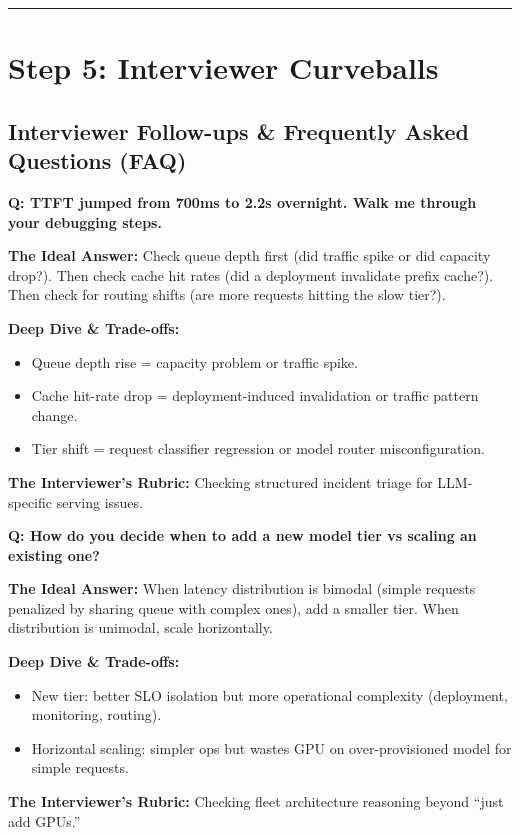\bigskip\hrule\bigskip

\section*{Step 5: Interviewer Curveballs}

\subsection*{Interviewer Follow-ups \& Frequently Asked Questions (FAQ)}

\textbf{Q: TTFT jumped from 700ms to 2.2s overnight. Walk me through your debugging steps.}

\textbf{The Ideal Answer:} Check queue depth first (did traffic spike or did capacity drop?). Then check cache hit rates (did a deployment invalidate prefix cache?). Then check for routing shifts (are more requests hitting the slow tier?).

\textbf{Deep Dive \& Trade-offs:}
\begin{itemize}
  \item Queue depth rise = capacity problem or traffic spike.
  \item Cache hit-rate drop = deployment-induced invalidation or traffic pattern change.
  \item Tier shift = request classifier regression or model router misconfiguration.
\end{itemize}

\textbf{The Interviewer's Rubric:} Checking structured incident triage for LLM-specific serving issues.

\textbf{Q: How do you decide when to add a new model tier vs scaling an existing one?}

\textbf{The Ideal Answer:} When latency distribution is bimodal (simple requests penalized by sharing queue with complex ones), add a smaller tier. When distribution is unimodal, scale horizontally.

\textbf{Deep Dive \& Trade-offs:}
\begin{itemize}
  \item New tier: better SLO isolation but more operational complexity (deployment, monitoring, routing).
  \item Horizontal scaling: simpler ops but wastes GPU on over-provisioned model for simple requests.
\end{itemize}

\textbf{The Interviewer's Rubric:} Checking fleet architecture reasoning beyond ``just add GPUs.''

